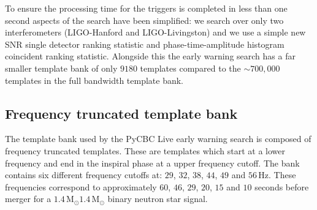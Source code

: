 To ensure the processing time for the triggers is completed in less than one second aspects of the search have been simplified: we search over only two interferometers (LIGO-Hanford and LIGO-Livingston) and we use a simple new SNR single detector ranking statistic and phase-time-amplitude histogram coincident ranking statistic. Alongside this the early warning search has a far smaller template bank of only $9180$ templates compared to the ${\sim}700,000$ templates in the full bandwidth template bank.

\subsection{\label{6:sec:early-warning-template-bank}Frequency truncated template bank}

The template bank used by the PyCBC Live early warning search is composed of frequency truncated templates. These are \gwadj templates which start at a lower frequency and end in the inspiral phase at a upper frequency cutoff. The bank contains six different frequency cutoffs at: $29$, $32$, $38$, $44$, $49$ and $56 \, \text{Hz}$. These frequencies correspond to approximately $60$, $46$, $29$, $20$, $15$ and $10$ seconds before merger for a $1.4 \, \text{M$_\odot$}$\text{--}$1.4\, \text{M$_\odot$}$ binary neutron star signal.

